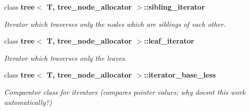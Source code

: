 \begin{DoxyCompactItemize}
class {\bf tree$<$ T, tree\+\_\+node\+\_\+allocator $>$\+::sibling\+\_\+iterator}
\begin{DoxyCompactList}\small\item\em Iterator which traverses only the nodes which are siblings of each other. \end{DoxyCompactList}\item 
class {\bf tree$<$ T, tree\+\_\+node\+\_\+allocator $>$\+::leaf\+\_\+iterator}
\begin{DoxyCompactList}\small\item\em Iterator which traverses only the leaves. \end{DoxyCompactList}\item 
class {\bf tree$<$ T, tree\+\_\+node\+\_\+allocator $>$\+::iterator\+\_\+base\+\_\+less}
\begin{DoxyCompactList}\small\item\em Comparator class for iterators (compares pointer values; why doesn\textquotesingle{}t this work automatically?) \end{DoxyCompactList}\end{DoxyCompactItemize}
